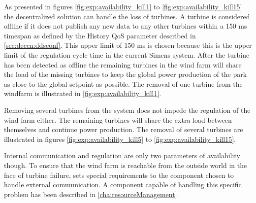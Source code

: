 As presented in figures \ref{fig:exp:availability_kill1} to \ref{fig:exp:availability_kill15} the decentralized solution can handle the loss of turbines. A turbine is considered offline if it does not publish any new data to any other turbines within a 150 ms timespan as defined by the History QoS parameter described in \cref{sec:decen:ddsconf}.
This upper limit of 150 ms is chosen because this is the upper limit of the regulation cycle time in the current Simens system.
After the turbine has been detected as offline the remaining turbines in the wind farm will share the load of the missing turbines to keep the global power production of the park as close to the global setpoint as possible. The removal of one turbine from the windfarm is illustrated in \cref{fig:exp:availability_kill1}.

Removing several turbines from the system does not impede the regulation of the wind farm either. The remaining turbines will share the extra load between themselves and continue power production. The removal of several turbines are illustrated in figures \ref{fig:exp:availability_kill5} to \ref{fig:exp:availability_kill15}.

%
%

Internal communication and regulation are only two parameters of availability though. To ensure that the wind farm is reachable from the outside world in the face of turbine failure, sets special requirements to the component chosen to handle external communication. A component capable of handling this specific problem has been described in \cref{cha:resourceManagement}.

